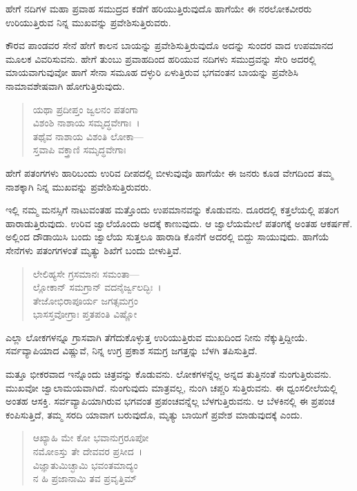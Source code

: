 {\small ಹೇಗೆ ನದಿಗಳ ಮಹಾ ಪ್ರವಾಹ ಸಮುದ್ರದ ಕಡೆಗೆ ಹರಿಯುತ್ತಿರುವುದೊ ಹಾಗೆಯೇ ಈ ನರಲೋಕವೀರರು ಉರಿಯುತ್ತಿರುವ ನಿನ್ನ ಮುಖವನ್ನು ಪ್ರವೇಶಿಸುತ್ತಿರುವರು.}

ಕೌರವ ಪಾಂಡವರ ಸೇನೆ ಹೇಗೆ ಕಾಲನ ಬಾಯನ್ನು ಪ್ರವೇಶಿಸುತ್ತಿರುವುದೊ ಅದನ್ನು ಸುಂದರ ವಾದ ಉಪಮಾನದ ಮೂಲಕ ವಿವರಿಸುವನು. ಹೇಗೆ ತುಂಬು ಪ್ರವಾಹದಿಂದ ಹರಿಯುವ ನದಿಗಳು ಸಮುದ್ರವನ್ನು ಸೇರಿ ಅದರಲ್ಲಿ ಮಾಯವಾಗುವುವೋ ಹಾಗೆ ಸೇನಾ ಸಮೂಹ ದಳ್ಳುರಿ ಏಳುತ್ತಿರುವ ಭಗವಂತನ ಬಾಯನ್ನು ಪ್ರವೇಶಿಸಿ ನಾಮಾವಶೇಷವಾಗಿ ಹೋಗುತ್ತಿರುವುದು.

\begin{verse}
ಯಥಾ ಪ್ರದೀಪ್ತಂ ಜ್ವಲನಂ ಪತಂಗಾ \\ ವಿಶಂಶಿ ನಾಶಾಯ ಸಮೃದ್ಧವೇಗಾಃ~।\\ತಥೈವ ನಾಶಾಯ ವಿಶಂತಿ ಲೋಕಾ—\\ ಸ್ತವಾಪಿ ವಕ್ತ್ರಾಣಿ ಸಮೃದ್ಧವೇಗಾಃ 
\end{verse}

{\small ಹೇಗೆ ಪತಂಗಗಳು ಹಾರಿಬಂದು ಉರಿವ ದೀಪದಲ್ಲಿ ಬೀಳುವುವೊ ಹಾಗೆಯೇ ಈ ಜನರು ಕೂಡ ವೇಗದಿಂದ ತಮ್ಮ ನಾಶಕ್ಕಾಗಿ ನಿನ್ನ ಮುಖವನ್ನು ಪ್ರವೇಶಿಸುತ್ತಿರುವರು.}

ಇಲ್ಲಿ ನಮ್ಮ ಮನಸ್ಸಿಗೆ ನಾಟುವಂತಹ ಮತ್ತೊಂದು ಉಪಮಾನವನ್ನು ಕೊಡುವನು. ದೂರದಲ್ಲಿ ಕತ್ತಲೆಯಲ್ಲಿ ಪತಂಗ ಹಾರಾಡುತ್ತಿರುವುದು. ಉರಿವ ಜ್ವಾಲೆಯೊಂದು ಅದಕ್ಕೆ ಕಾಣುವುದು. ಆ ಜ್ವಾಲೆಯಮೇಲೆ ಪತಂಗಕ್ಕೆ ಅಂತಹ ಆಕರ್ಷಣೆ. ಅಲ್ಲಿಂದ ದೌಡಾಯಿಸಿ ಬಂದು ಜ್ವಾಲೆಯ ಸುತ್ತಲೂ ಹಾರಾಡಿ ಕೊನೆಗೆ ಅದರಲ್ಲಿ ಬಿದ್ದು ಸಾಯುವುದು. ಹಾಗೆಯೆ ಸೇನೆಗಳು ಪತಂಗಗಳಂತೆ ಮೃತ್ಯು ಶಿಖೆಗೆ ಬಂದು ಬೀಳುತ್ತಿವೆ.

\begin{verse}
ಲೇಲಿಹ್ಯಸೇ ಗ್ರಸಮಾನಃ ಸಮಂತಾ—\\ ಲ್ಲೋಕಾನ್ ಸಮಗ್ರಾನ್ ವದನೈರ್ಜ್ವಲದ್ಭಿಃ~।\\ತೇಜೋಭಿರಾಪೂರ್ಯ ಜಗತ್ಸಮಗ್ರಂ \\ ಭಾಸಸ್ತವೋಗ್ರಾಃ ಪ್ತತಪಂತಿ ವಿಷ್ಣೋ 
\end{verse}

{\small ಎಲ್ಲಾ ಲೋಕಗಳನ್ನೂ ಗ್ರಾಸವಾಗಿ ತೆಗೆದುಕೊಳ್ಳುತ್ತ ಉರಿಯುತ್ತಿರುವ ಮುಖದಿಂದ ನೀನು ನೆಕ್ಕುತ್ತಿದ್ದೀಯೆ. ಸರ್ವವ್ಯಾಪಿಯಾದ ವಿಷ್ಣುವೆ, ನಿನ್ನ ಉಗ್ರ ಪ್ರಕಾಶ ಸಮಗ್ರ ಜಗತ್ತನ್ನು ಬೆಳಗಿ ತಪಿಸುತ್ತಿದೆ.}

ಮತ್ತೂ ಭೀಕರವಾದ ಇನ್ನೊಂದು ಚಿತ್ರವನ್ನು ಕೊಡುವನು. ಲೋಕಗಳನ್ನೆಲ್ಲ ಅನ್ನದ ತುತ್ತಿನಂತೆ ನುಂಗುತ್ತಿರುವನು. ಮುಖವೋ ಜ್ವಾಲಾಮಯವಾಗಿದೆ. ನುಂಗುವುದು ಮಾತ್ರವಲ್ಲ, ನುಂಗಿ ಚಪ್ಚರಿ ಸುತ್ತಿರುವನು. ಈ ಧ್ವಂಸಲೀಲೆಯಲ್ಲಿ ಅಂತಹ ಆಸಕ್ತಿ. ಸರ್ವವ್ಯಾಪಿಯಾಗಿರುವ ಭಗವಂತ ಪ್ರಪಂಚವನ್ನೆಲ್ಲ ಬೆಳಗುತ್ತಿರುವನು. ಆ ಬೆಳಕಿನಲ್ಲಿ ಈ ಪ್ರಪಂಚ ಕಂಪಿಸುತ್ತಿದೆ, ತಮ್ಮ ಸರದಿ ಯಾವಾಗ ಬರುವುದೊ, ಮೃತ್ಯು ಬಾಯಿಗೆ ಪ್ರವೇಶ ಮಾಡುವುದಕ್ಕೆ ಎಂದು.

\begin{verse}
ಆಖ್ಯಾಹಿ ಮೇ ಕೋ ಭವಾನುಗ್ರರೂಪೋ \\ ನಮೋಽಸ್ತು ತೇ ದೇವವರ ಪ್ರಸೀದ~।\\ವಿಜ್ಞಾತುಮಿಚ್ಛಾಮಿ ಭವಂತಮಾದ್ಯಂ \\ ನ ಹಿ ಪ್ರಜಾನಾಮಿ ತವ ಪ್ರವೃತ್ತಿಮ್ 
\end{verse}

